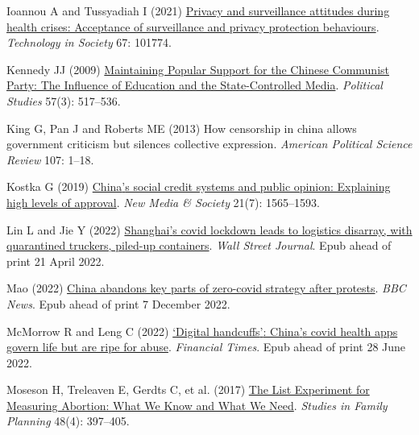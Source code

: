 \documentclass[
  letterpaper,
  DIV=11,
  numbers=noendperiod]{scrartcl}
\newlength{\cslhangindent}
\newlength{\cslentryspacingunit} %
\newenvironment{CSLReferences}[2] %
 {%
  \setlength{\parindent}{0pt}
  \ifodd #1
  \let\oldpar\par
  \def\par{\hangindent=\cslhangindent\oldpar}
  \fi
  \setlength{\parskip}{#2\cslentryspacingunit}
 }%
 {}
\begin{document}
\begin{CSLReferences}{1}{0}
\leavevmode{}%
Ioannou A and Tussyadiah I (2021)
\href{https://doi.org/10.1016/j.techsoc.2021.101774}{Privacy and
surveillance attitudes during health crises: Acceptance of surveillance
and privacy protection behaviours}. \emph{Technology in Society} 67:
101774.

\leavevmode{}%
Kennedy JJ (2009)
\href{https://doi.org/10.1111/j.1467-9248.2008.00740.x}{Maintaining
Popular Support for the Chinese Communist Party: The Influence of
Education and the State-Controlled Media}. \emph{Political Studies}
57(3): 517--536.

\leavevmode{}%
King G, Pan J and Roberts ME (2013) How censorship in china allows
government criticism but silences collective expression. \emph{American
Political Science Review} 107: 1--18.

\leavevmode{}%
Kostka G (2019)
\href{https://doi.org/10.1177/1461444819826402}{China{'}s social credit
systems and public opinion: Explaining high levels of approval}.
\emph{New Media \& Society} 21(7): 1565--1593.

\leavevmode{}%
Lin L and Jie Y (2022)
\href{https://www.wsj.com/articles/shanghai-lockdown-leads-to-logistics-disarray-with-quarantined-truckers-piled-up-containers-11650537303}{Shanghai{'}s
covid lockdown leads to logistics disarray, with quarantined truckers,
piled-up containers}. \emph{Wall Street Journal}. Epub ahead of print 21
April 2022.

\leavevmode{}%
Mao (2022)
\href{https://www.bbc.com/news/world-asia-china-63855508}{China abandons
key parts of zero-covid strategy after protests}. \emph{BBC News}. Epub
ahead of print 7 December 2022.

\leavevmode{}%
McMorrow R and Leng C (2022)
\href{https://www.ft.com/content/dee6bcc6-3fc5-4edc-814d-46dc73e67c7e}{{`}Digital
handcuffs{'}: China{'}s covid health apps govern life but are ripe for
abuse}. \emph{Financial Times}. Epub ahead of print 28 June 2022.

\leavevmode{}%
Moseson H, Treleaven E, Gerdts C, et al. (2017)
\href{https://doi.org/10.1111/sifp.12042}{The List Experiment for
Measuring Abortion: What We Know and What We Need}. \emph{Studies in
Family Planning} 48(4): 397--405.


\end{CSLReferences}
\end{document}

